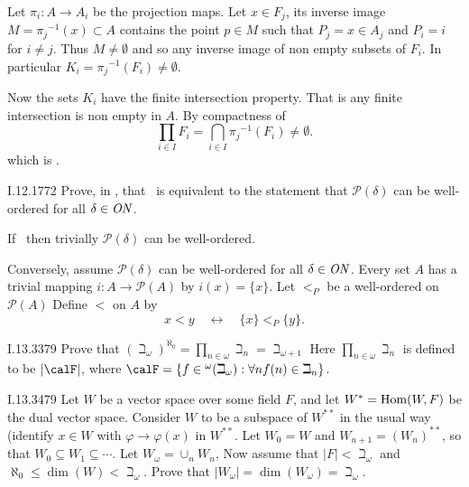 Let \(\pi_i: A \to A_i\) be the projection maps.
Let \(x \in F_j\), its inverse image \(M = {\pi_j}^{-1}(x) \subset A\)
contains the point \(p\in M\)
such that \(P_j = x \in A_j\) and \(P_i = i\) for \(i \neq j\).
Thus \(M\neq \emptyset\) and so any inverse image of non empty
subsets of \(F_i\). In particular \(K_i = {\pi_j}^{-1}(F_i) \neq \emptyset\).

Now the sets \(K_i\) have the finite intersection property.
That is any finite intersection is non empty in $A$.
By compactness of
\begin{equation*}
\prod_{i\in I} F_i = \bigcap_{i\in I} {\pi_j}^{-1}(F_i) \neq \emptyset.
\end{equation*}
which is \AC.

\begin{lexcopy}{I.12.17}{72}
Prove, in \ZF, that \AC\ is equivalent to the statement that
\(\mathcal{P}(\delta)\) can be well-ordered
for all \(\delta \in \mathit{ON}\).
\end{lexcopy}
If \AC\ then trivially \(\mathcal{P}(\delta)\) can be well-ordered.

Conversely, assume \(\mathcal{P}(\delta)\) can be well-ordered
for all \(\delta \in \mathit{ON}\).
Every set $A$ has a trivial mapping \(i: A \to \mathcal{P}(A)\)
by \(i(x) = \{x\}\).
Let \(<_P\) be a well-ordered on \(\mathcal{P}(A)\)
Define \(<\) on $A$ by
\begin{equation*}
x < y \quad \leftrightarrow \quad \{x\} <_P \{y\}.
\end{equation*}

\begin{lexcopy}{I.13.33}{79}
Prove that
\((\beth_\omega)^{\aleph_0} = \prod_{n\in\omega}\beth_n = \beth_{\omega + 1}\)
Here \(\prod_{n\in\omega}\beth_n\)
is defined to be
\(|\calF|\), where
\(\calF = \{f \in {}^\omega(\beth_\omega): \forall n f(n) \in \beth_n\}\).
\end{lexcopy}
\unfinished

\begin{lexcopy}{I.13.34}{79}
Let $W$ be a vector space over some field $F$, and let \(W^* = \operatorname{Hom}(W, F)\)
be the dual vector space. Consider $W$ to be a subspace of \(W^{**}\) in
the usual way (identify \(x \in W\) with
\(\varphi \to \varphi(x)\) in \(W^{**}\). Let \(W_0 = W\) and
\(W_{n+1} = (W_n)^{**}\), so that
\(W_0 \subseteq W_1 \subseteq \cdots\). Let \(W_\omega = \cup_n W_n\),
Now assume that
\(|F| < \beth_\omega\) and \(\aleph_0 \leq \dim(W) < \beth_\omega\).
Prove that \(|W_\omega| = \dim(W_\omega) = \beth_\omega\).
\end{lexcopy}
\unfinished
